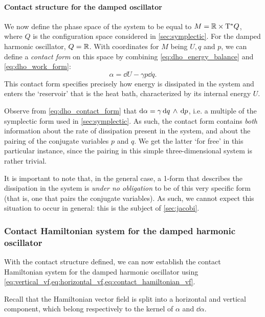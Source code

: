 \paragraph{Contact structure for the damped oscillator} We now define the phase space of the system to be equal to \(M = \mathbb{R} \times \mathrm{T}^*Q\), where \(Q\) is the configuration space considered in \cref{sec:symplectic}. For the damped harmonic oscillator, \(Q = \mathbb{R}\). With coordinates for \(M\) being \(U, q\) and \(p\), we can define a \emph{contact form} on this space by combining \cref{eq:dho_energy_balance} and \cref{eq:dho_work_form}: 
\begin{equation}
    \alpha = \dd{U} - \gamma p \dd{q}.
    \label{eq:dho_contact_form}
\end{equation}
This contact form specifies precisely how energy is dissipated in the system and enters the `reservoir' that is the heat bath, characterized by its internal energy \(U\).

Observe from \cref{eq:dho_contact_form} that \(\dd{\alpha} = \gamma  \dd{q}\,\wedge\,\dd{p} \), i.e. a multiple of the symplectic form used in \cref{sec:symplectic}. As such, the contact form contains \emph{both} information about the rate of dissipation present in the system, and about the pairing of the conjugate variables \(p\) and \(q\). We get the latter `for free' in this particular instance, since the pairing in this simple three-dimensional system is rather trivial.

It is important to note that, in the general case, a 1-form that describes the dissipation in the system is \emph{under no obligation} to be of this very specific form (that is, one that pairs the conjugate variables). As such, we cannot expect this situation to occur in general: this is the subject of \cref{sec:jacobi}.

\subsubsection{Contact Hamiltonian system for the damped harmonic oscillator}
With the contact structure defined, we can now establish the contact Hamiltonian system for the damped harmonic oscillator using \cref{eq:vertical_vf,eq:horizontal_vf,eq:contact_hamiltonian_vf}.

Recall that the Hamiltonian vector field is split into a horizontal and vertical component, which belong respectively to the kernel of \(\alpha\) and \(\dd{\alpha}\).

